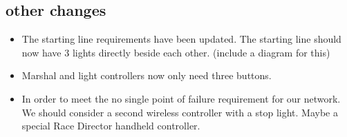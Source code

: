 \documentclass{article}
\begin{document}
     \subsection{other changes}
     \begin{itemize}
     	\item The starting line requirements have been updated. 
     	The starting line should now have 3 lights directly beside each other.
     	(include a diagram for this)
     	\item Marshal and light controllers now only need three buttons.
     	\item In order to meet the no single point of failure requirement for our network.
     	We should consider a second wireless controller with a stop light. Maybe a special Race Director handheld controller.
     \end{itemize}
\end{document}
